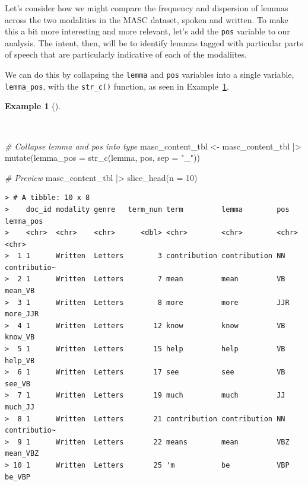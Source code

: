 \documentclass[
  letterpaper,
]{latex/krantz}
\newenvironment{Shaded}{\begin{snugshade}}{\end{snugshade}}
\newcommand{\AttributeTok}[1]{\textcolor[rgb]{0.00,0.00,0.00}{#1}}
\newcommand{\CommentTok}[1]{\textcolor[rgb]{0.00,0.00,0.00}{\textit{#1}}}
\newcommand{\DecValTok}[1]{\textcolor[rgb]{0.00,0.00,0.00}{#1}}
\newcommand{\FunctionTok}[1]{\textcolor[rgb]{0.00,0.00,0.00}{#1}}
\newcommand{\NormalTok}[1]{\textcolor[rgb]{0.00,0.00,0.00}{#1}}
\newcommand{\OtherTok}[1]{\textcolor[rgb]{0.00,0.00,0.00}{#1}}
\newcommand{\SpecialCharTok}[1]{\textcolor[rgb]{0.00,0.00,0.00}{#1}}
\newcommand{\StringTok}[1]{\textcolor[rgb]{0.00,0.00,0.00}{#1}}
\theoremstyle{definition}
\newtheorem{example}{Example}[chapter]
\theoremstyle{remark}
\begin{document}
Let's consider how we might compare the frequency and dispersion of
lemmas across the two modalities in the MASC dataset, spoken and
written. To make this a bit more interesting and more relevant, let's
add the \texttt{pos} variable to our analysis. The intent, then, will be
to identify lemmas tagged with particular parts of speech that are
particularly indicative of each of the modaliites.

We can do this by collapsing the \texttt{lemma} and \texttt{pos}
variables into a single variable, \texttt{lemma\_pos}, with the
\texttt{str\_c()} function, as seen in Example~\ref{exm-eda-masc-type}.

\begin{example}[]\protect\hypertarget{exm-eda-masc-type}{}\label{exm-eda-masc-type}

~

\begin{Shaded}
\begin{Highlighting}[]
\CommentTok{\# Collapse lemma and pos into type}
\NormalTok{masc\_content\_tbl }\OtherTok{\textless{}{-}}
\NormalTok{  masc\_content\_tbl }\SpecialCharTok{|\textgreater{}}
  \FunctionTok{mutate}\NormalTok{(}\AttributeTok{lemma\_pos =} \FunctionTok{str\_c}\NormalTok{(lemma, pos, }\AttributeTok{sep =} \StringTok{"\_"}\NormalTok{))}

\CommentTok{\# Preview}
\NormalTok{masc\_content\_tbl }\SpecialCharTok{|\textgreater{}}
  \FunctionTok{slice\_head}\NormalTok{(}\AttributeTok{n =} \DecValTok{10}\NormalTok{)}
\end{Highlighting}
\end{Shaded}

\begin{verbatim}
> # A tibble: 10 x 8
>    doc_id modality genre   term_num term         lemma        pos   lemma_pos   
>    <chr>  <chr>    <chr>      <dbl> <chr>        <chr>        <chr> <chr>       
>  1 1      Written  Letters        3 contribution contribution NN    contributio~
>  2 1      Written  Letters        7 mean         mean         VB    mean_VB     
>  3 1      Written  Letters        8 more         more         JJR   more_JJR    
>  4 1      Written  Letters       12 know         know         VB    know_VB     
>  5 1      Written  Letters       15 help         help         VB    help_VB     
>  6 1      Written  Letters       17 see          see          VB    see_VB      
>  7 1      Written  Letters       19 much         much         JJ    much_JJ     
>  8 1      Written  Letters       21 contribution contribution NN    contributio~
>  9 1      Written  Letters       22 means        mean         VBZ   mean_VBZ    
> 10 1      Written  Letters       25 'm           be           VBP   be_VBP
\end{verbatim}

\end{example}
\end{document}
